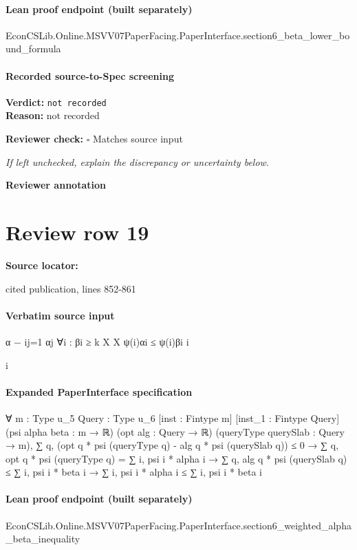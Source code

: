 \documentclass[10pt]{article}
\newcommand{\reviewerbox}{%
  \par\noindent\fbox{\parbox{0.96\linewidth}{\rule{0pt}{0.38in}}}\par
}
\newcommand{\reviewmatch}[1]{%
  \par\noindent\textbf{Reviewer check:} $\square$\; #1\par
  \noindent\emph{If left unchecked, explain the discrepancy or uncertainty below.}\par
}
\begin{document}
\paragraph{Lean proof endpoint (built separately)}\begin{ReviewVerbatim}
EconCSLib.Online.MSVV07PaperFacing.PaperInterface.section6_beta_lower_bound_formula
\end{ReviewVerbatim}

\paragraph{Recorded source-to-Spec screening}
\textbf{Verdict:} \texttt{not recorded}
\\
\textbf{Reason:} not recorded
\reviewmatch{Matches source input}
\noindent\textbf{Reviewer annotation}\par
\reviewerbox
\clearpage
\hypertarget{source-claim-f472537a93482b1e}{}
\section*{Review row 19}
\textbf{Source locator:} {\footnotesize\raggedright cited publication, lines 852-\allowbreak{}861\par}
\paragraph{Verbatim source input}
\begin{ReviewVerbatim}
α − ij=1 αj
∀i : βi ≥
k
X
X
ψ(i)αi ≤
ψ(i)βi
i

i
\end{ReviewVerbatim}


\paragraph{Expanded PaperInterface specification}
\begin{ReviewVerbatim}
∀ {m : Type u_5} {Query : Type u_6} [inst : Fintype m] [inst_1 : Fintype Query] (psi alpha beta : m → ℝ)
  (opt alg : Query → ℝ) (queryType querySlab : Query → m),
  ∑ q, (opt q * psi (queryType q) - alg q * psi (querySlab q)) ≤ 0 →
    ∑ q, opt q * psi (queryType q) = ∑ i, psi i * alpha i →
      ∑ q, alg q * psi (querySlab q) ≤ ∑ i, psi i * beta i → ∑ i, psi i * alpha i ≤ ∑ i, psi i * beta i
\end{ReviewVerbatim}

\paragraph{Lean proof endpoint (built separately)}\begin{ReviewVerbatim}
EconCSLib.Online.MSVV07PaperFacing.PaperInterface.section6_weighted_alpha_beta_inequality
\end{ReviewVerbatim}
\end{document}
